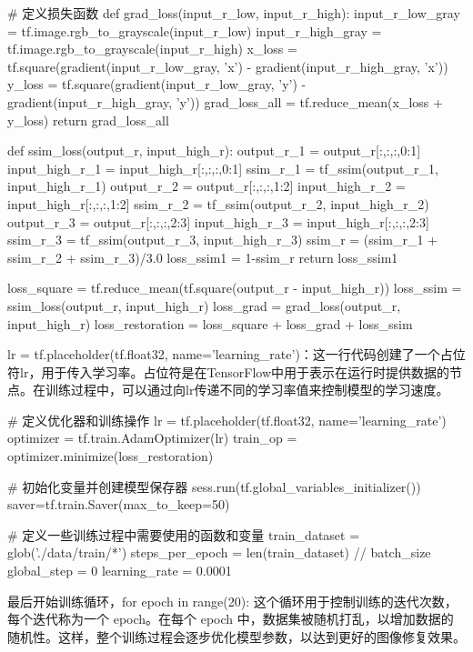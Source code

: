 \documentclass[letterpaper,12pt]{article}
\begin{document}
				\begin{python}
				# 定义损失函数
				def grad_loss(input_r_low, input_r_high):
					input_r_low_gray = tf.image.rgb_to_grayscale(input_r_low)
					input_r_high_gray = tf.image.rgb_to_grayscale(input_r_high)
					x_loss = tf.square(gradient(input_r_low_gray, 'x') - gradient(input_r_high_gray, 'x'))
					y_loss = tf.square(gradient(input_r_low_gray, 'y') - gradient(input_r_high_gray, 'y'))
					grad_loss_all = tf.reduce_mean(x_loss + y_loss)
					return grad_loss_all
					
				def ssim_loss(output_r, input_high_r):
					output_r_1 = output_r[:,:,:,0:1]
					input_high_r_1 = input_high_r[:,:,:,0:1]
					ssim_r_1 = tf_ssim(output_r_1, input_high_r_1)
					output_r_2 = output_r[:,:,:,1:2]
					input_high_r_2 = input_high_r[:,:,:,1:2]						ssim_r_2 = tf_ssim(output_r_2, input_high_r_2)
					output_r_3 = output_r[:,:,:,2:3]
					input_high_r_3 = input_high_r[:,:,:,2:3]
					ssim_r_3 = tf_ssim(output_r_3, input_high_r_3)
					ssim_r = (ssim_r_1 + ssim_r_2 + ssim_r_3)/3.0
					loss_ssim1 = 1-ssim_r
					return loss_ssim1
					
				loss_square = tf.reduce_mean(tf.square(output_r  - input_high_r))
				loss_ssim = ssim_loss(output_r, input_high_r)			
				loss_grad = grad_loss(output_r, input_high_r)
				loss_restoration = loss_square + loss_grad + loss_ssim
				\end{python}

				lr = tf.placeholder(tf.float32, name='learning\_rate')：这一行代码创建了一个占位符lr，用于传入学习率。占位符是在TensorFlow中用于表示在运行时提供数据的节点。在训练过程中，可以通过向lr传递不同的学习率值来控制模型的学习速度。
				
				\begin{python}
				# 定义优化器和训练操作
				lr = tf.placeholder(tf.float32, name='learning_rate')
				optimizer = tf.train.AdamOptimizer(lr)
				train_op = optimizer.minimize(loss_restoration)
				
				# 初始化变量并创建模型保存器
				sess.run(tf.global_variables_initializer())
				saver=tf.train.Saver(max_to_keep=50)
					
				# 定义一些训练过程中需要使用的函数和变量
				train_dataset = glob('./data/train/*')
				steps_per_epoch = len(train_dataset) // batch_size
				global_step = 0
				learning_rate = 0.0001
				\end{python}
				
				最后开始训练循环，for epoch in range(20): 这个循环用于控制训练的迭代次数，每个迭代称为一个 epoch。在每个 epoch 中，数据集被随机打乱，以增加数据的随机性。这样，整个训练过程会逐步优化模型参数，以达到更好的图像修复效果。
				
\end{document}
